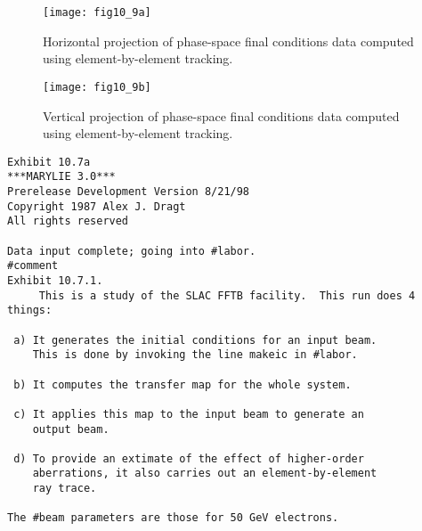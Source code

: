 \newpage
\begin{figure}[htbp]
\renewcommand{\thefigure}{\thesection.\arabic{figure}}
  \centering
  \texttt{[image: fig10\_9a]}
  \caption{Horizontal projection of phase-space final conditions data
computed using element-by-element tracking.}
\end{figure}

\newpage
\begin{figure}[htbp]
\renewcommand{\thefigure}{\thesection.\arabic{figure}}
  \centering
  \texttt{[image: fig10\_9b]}
  \caption{Vertical projection of phase-space final conditions data
computed using element-by-element tracking.}
\end{figure}

\newpage
\begin{footnotesize}
\begin{verbatim}
Exhibit 10.7a
***MARYLIE 3.0***
Prerelease Development Version 8/21/98
Copyright 1987 Alex J. Dragt
All rights reserved

Data input complete; going into #labor.
#comment
Exhibit 10.7.1.
     This is a study of the SLAC FFTB facility.  This run does 4
things:

 a) It generates the initial conditions for an input beam.
    This is done by invoking the line makeic in #labor.

 b) It computes the transfer map for the whole system.

 c) It applies this map to the input beam to generate an
    output beam.

 d) To provide an extimate of the effect of higher-order
    aberrations, it also carries out an element-by-element
    ray trace.

The #beam parameters are those for 50 GeV electrons.


\end{verbatim}
\end{footnotesize}
